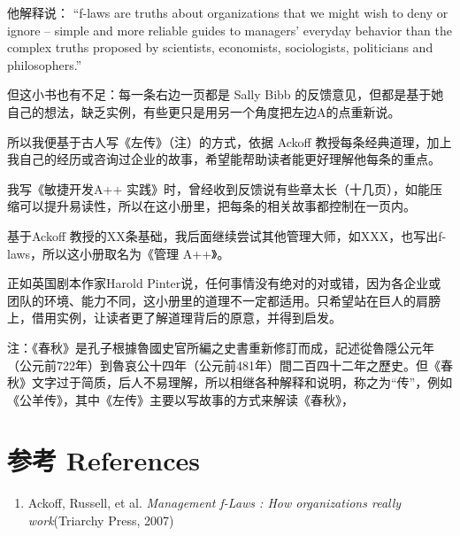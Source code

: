 他解释说： ``f-laws are truths about organizations that we might wish to
deny or ignore -- simple and more reliable guides to managers' everyday
behavior than the complex truths proposed by scientists, economists,
sociologists, politicians and philosophers.''

但这小书也有不足：每一条右边一页都是 Sally Bibb
的反馈意见，但都是基于她自己的想法，缺乏实例，有些更只是用另一个角度把左边A的点重新说。

所以我便基于古人写《左传》（注）的方式，依据 Ackoff
教授每条经典道理，加上我自己的经历或咨询过企业的故事，希望能帮助读者能更好理解他每条的重点。

我写《敏捷开发A++
实践》时，曾经收到反馈说有些章太长（十几页），如能压缩可以提升易读性，所以在这小册里，把每条的相关故事都控制在一页内。

基于Ackoff
教授的XX条基础，我后面继续尝试其他管理大师，如XXX，也写出f-laws，所以这小册取名为《管理
A++》。

正如英国剧本作家Harold
Pinter说，任何事情没有绝对的对或错，因为各企业或团队的环境、能力不同，这小册里的道理不一定都适用。只希望站在巨人的肩膀上，借用实例，让读者更了解道理背后的原意，并得到启发。

\begin{description}
\tightlist
\item[]
注：《春秋》是孔子根據魯國史官所編之史書重新修訂而成，記述從魯隱公元年（公元前722年）到魯哀公十四年（公元前481年）間二百四十二年之歷史。但《春秋》文字过于简质，后人不易理解，所以相继各种解释和说明，称之为``传''，例如《公羊传》，其中《左传》主要以写故事的方式来解读《春秋》，
\end{description}

\hypertarget{ux53c2ux8003-references}{%
\section{参考 References}\label{ux53c2ux8003-references}}

\begin{enumerate}
\tightlist
\item
  Ackoff, Russell, et al. \emph{Management f-Laws : How organizations
  really work}(Triarchy Press, 2007)\\
\end{enumerate}


